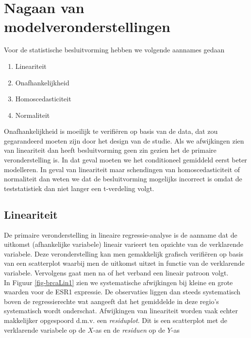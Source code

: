 \documentclass[
  dutch,
  letterpaper,
  12pt]{book}
\providecommand{\tightlist}{%
  \setlength{\itemsep}{0pt}\setlength{\parskip}{0pt}}
\theoremstyle{definition}
\theoremstyle{definition}
\theoremstyle{definition}
\theoremstyle{remark}
\begin{document}
\section{Nagaan van
modelveronderstellingen}\label{nagaan-van-modelveronderstellingen}

Voor de statistische besluitvorming hebben we volgende aannames gedaan

\begin{enumerate}
\def\labelenumi{\arabic{enumi}.}
\tightlist
\item
  Lineariteit
\item
  Onafhankelijkheid\\
\item
  Homoscedasticiteit
\item
  Normaliteit
\end{enumerate}

Onafhankelijkheid is moeilijk te verifiëren op basis van de data, dat
zou gegarandeerd moeten zijn door het design van de studie. Als we
afwijkingen zien van lineariteit dan heeft besluitvorming geen zin
gezien het de primaire veronderstelling is. In dat geval moeten we het
conditioneel gemiddeld eerst beter modelleren. In geval van lineariteit
maar schendingen van homoscedasticiteit of normaliteit dan weten we dat
de besluitvorming mogelijks incorrect is omdat de teststatistiek dan
niet langer een t-verdeling volgt.

\subsection{Lineariteit}\label{lineariteit}

De primaire veronderstelling in lineaire regressie-analyse is de aanname
dat de uitkomst (afhankelijke variabele) lineair varieert ten opzichte
van de verklarende variabele. Deze veronderstelling kan men gemakkelijk
grafisch verifiëren op basis van een scatterplot waarbij men de uitkomst
uitzet in functie van de verklarende variabele. Vervolgens gaat men na
of het verband een lineair patroon volgt.\\
In Figuur \ref{fig-brcaLin1} zien we systematische afwijkingen bij
kleine en grote waarden voor de ESR1 expressie. De observaties liggen
dan steeds systematisch boven de regressierechte wat aangeeft dat het
gemiddelde in deze regio's systematisch wordt onderschat. Afwijkingen
van lineariteit worden vaak echter makkelijker opgespoord d.m.v. een
\emph{residuplot}. Dit is een scatterplot met de verklarende variabele
op de \(X\)-as en de \emph{residuen} op de \(Y\)-as
\end{document}
